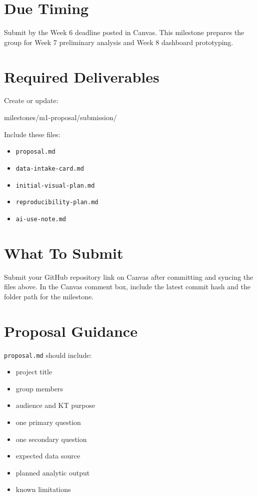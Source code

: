 \documentclass[
  letterpaper,
  DIV=11,
  numbers=noendperiod,
  oneside]{scrreprt}
\newenvironment{Shaded}{\begin{snugshade}}{\end{snugshade}}
\newcommand{\NormalTok}[1]{\textcolor[rgb]{0.00,0.23,0.31}{#1}}
\providecommand{\tightlist}{%
  \setlength{\itemsep}{0pt}\setlength{\parskip}{0pt}}
\begin{document}
\section{Due Timing}\label{due-timing-1}

Submit by the Week 6 deadline posted in Canvas. This milestone prepares
the group for Week 7 preliminary analysis and Week 8 dashboard
prototyping.

\section{Required Deliverables}\label{required-deliverables-1}

Create or update:

\begin{Shaded}
\begin{Highlighting}[numbers=left,,]
\NormalTok{milestones/m1{-}proposal/submission/}
\end{Highlighting}
\end{Shaded}

Include these files:

\begin{itemize}
\tightlist
\item
  \texttt{proposal.md}
\item
  \texttt{data-intake-card.md}
\item
  \texttt{initial-visual-plan.md}
\item
  \texttt{reproducibility-plan.md}
\item
  \texttt{ai-use-note.md}
\end{itemize}

\section{What To Submit}\label{what-to-submit-1}

Submit your GitHub repository link on Canvas after committing and
syncing the files above. In the Canvas comment box, include the latest
commit hash and the folder path for the milestone.

\section{Proposal Guidance}\label{proposal-guidance}

\texttt{proposal.md} should include:

\begin{itemize}
\tightlist
\item
  project title
\item
  group members
\item
  audience and KT purpose
\item
  one primary question
\item
  one secondary question
\item
  expected data source
\item
  planned analytic output
\item
  known limitations
\end{itemize}
\end{document}
